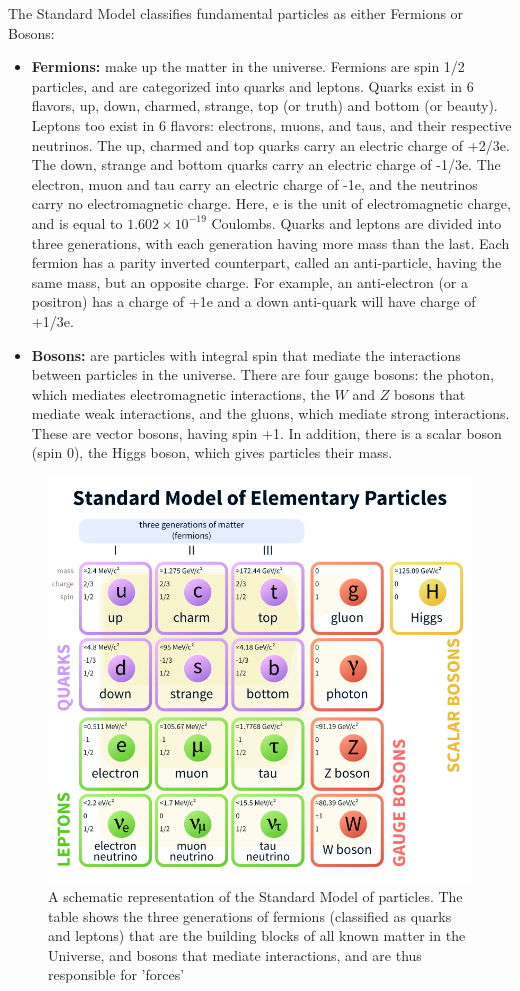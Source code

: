 \documentclass[11pt,a4paper,openright,twoside]{report}
\begin{document}
The Standard Model classifies fundamental particles as either Fermions or Bosons:
\begin{itemize}
\item \textbf{Fermions:} make up the matter in the universe. Fermions are spin 1/2 particles, and are categorized into quarks and leptons. Quarks exist in 6 flavors, up, down, charmed, strange, top (or truth) and bottom (or beauty). Leptons too exist in 6 flavors: electrons, muons, and taus, and their respective neutrinos. The up, charmed and top quarks carry an electric charge of +2/3e. The down, strange and bottom quarks carry an electric charge of -1/3e. The electron, muon and tau carry an electric charge of -1e, and the neutrinos carry no electromagnetic charge. Here, e is the unit of electromagnetic charge, and is equal to $1.602\times 10^{-19}$ Coulombs. Quarks and leptons are divided into three generations, with each generation having more mass than the last. Each fermion has a parity inverted counterpart, called an anti-particle, having the same mass, but an opposite charge. For example, an anti-electron (or a positron) has a charge of +1e and a down anti-quark will have charge of +1/3e.
\item \textbf{Bosons:} are particles with integral spin that mediate the interactions between particles in the universe. There are four gauge bosons: the photon, which mediates electromagnetic interactions, the $W$ and $Z$ bosons that mediate weak interactions, and the gluons, which mediate strong interactions. These are vector bosons, having spin +1. In addition, there is a scalar boson (spin 0), the Higgs boson, which gives particles their mass.
\end{itemize}
\begin{figure}[h]
\centering
\includegraphics[width=0.7\linewidth]{standard_model.png}
\caption{A schematic representation of the Standard Model\cite{SM} of particles. The table shows the three generations of fermions (classified as quarks and leptons) that are the building blocks of all known matter in the Universe, and bosons that mediate interactions, and are thus responsible for 'forces'}
\label{fig:SM}
\end{figure}
\end{document}

